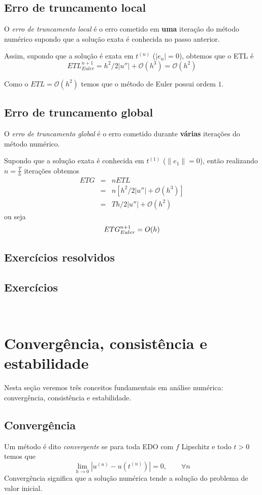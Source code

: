 \subsection{Erro de truncamento local}

O \emph{erro de truncamento local} é o erro cometido em \textbf{uma} iteração do método numérico supondo que a solução exata é conhecida no passo anterior.

Assim, supondo que a solução é exata em $t^{(n)}$ ($|e_n|=0$), obtemos que o ETL é
$$ETL_{Euler}^{n+1}= h^2/2|u''|+ \mathcal O(h^3) = \mathcal O(h^2)$$

Como o $ETL=\mathcal O(h^2)$ temos que o método de Euler possui ordem $1$.


\subsection{Erro de truncamento global}
O \emph{erro de truncamento global} é o erro cometido durante \textbf{várias} iterações do método numérico.

Supondo que a solução exata é conhecida em $t^{(1)}$ ($\|e_1\|=0$), então realizando $n=\frac{T}{h}$ iterações obtemos
\begin{eqnarray}
   ETG &=& nETL \\
       &=& n[h^2/2|u''|+ \mathcal O(h^3)] \\
       &=& Th/2|u''|+ \mathcal O(h^2)
\end{eqnarray}
ou seja
$$ETG_{Euler}^{n+1} = \mathcal \mathcal{O}(h)$$

\subsection*{Exercícios resolvidos}

\emconstrucao

\subsection*{Exercícios}
\

\section{Convergência, consistência e estabilidade}
Nesta seção veremos três conceitos fundamentais em análise numérica: convergência, consistência e estabilidade.

\subsection{Convergência}
Um método é dito \emph{convergente} se para toda EDO com $f$ Lipschitz e todo $t>0$ temos que
$$ \lim_{h \rightarrow 0} |u^{(n)} - u(t^{(n)})| =0, \quad \quad \forall n$$
Convergência significa que a solução numérica tende a solução do problema de valor inicial.



